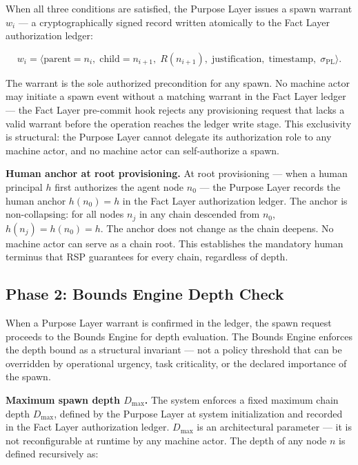 When all three conditions are satisfied, the Purpose Layer issues a spawn warrant $w_i$ — a cryptographically signed record written atomically to the Fact Layer authorization ledger:

\begin{equation}
w_i = \bigl\langle
\text{parent}=n_i,\;
\text{child}=n_{i+1},\;
R(n_{i+1}),\;
\text{justification},\;
\text{timestamp},\;
\sigma_{\text{PL}}
\bigr\rangle .
\label{eq:spawn-warrant}
\end{equation}

The warrant is the sole authorized precondition for any spawn. No machine actor may initiate a spawn event without a matching warrant in the Fact Layer ledger — the Fact Layer pre-commit hook rejects any provisioning request that lacks a valid warrant before the operation reaches the ledger write stage. This exclusivity is structural: the Purpose Layer cannot delegate its authorization role to any machine actor, and no machine actor can self-authorize a spawn.

\medskip
\noindent\textbf{Human anchor at root provisioning.} At root provisioning — when a human principal $h$ first authorizes the agent node $n_0$ — the Purpose Layer records the human anchor $h(n_0) = h$ in the Fact Layer authorization ledger. The anchor is non-collapsing: for all nodes $n_j$ in any chain descended from $n_0$, $h(n_j) = h(n_0) = h$. The anchor does not change as the chain deepens. No machine actor can serve as a chain root. This establishes the mandatory human terminus that RSP guarantees for every chain, regardless of depth.

\subsection{Phase 2: Bounds Engine Depth Check}

When a Purpose Layer warrant is confirmed in the ledger, the spawn request proceeds to the Bounds Engine for depth evaluation. The Bounds Engine enforces the depth bound as a structural invariant — not a policy threshold that can be overridden by operational urgency, task criticality, or the declared importance of the spawn.

\medskip
\noindent\textbf{Maximum spawn depth $D_{\max}$.} The system enforces a fixed maximum chain depth $D_{\max}$, defined by the Purpose Layer at system initialization and recorded in the Fact Layer authorization ledger. $D_{\max}$ is an architectural parameter — it is not reconfigurable at runtime by any machine actor. The depth of any node $n$ is defined recursively as:


